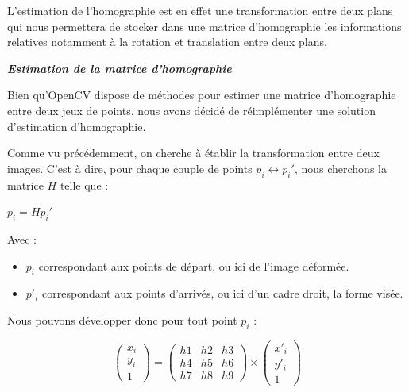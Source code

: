         L'estimation de l'homographie est en effet une transformation entre deux plans qui nous permettera de stocker dans une matrice d'homographie les informations relatives notamment à la rotation et translation entre deux plans.

        \textbf{\textit{Estimation de la matrice d'homographie}}

        Bien qu'OpenCV dispose de méthodes pour estimer une matrice d'homographie entre deux jeux de points, nous avons décidé de réimplémenter une solution d'estimation d'homographie.

        Comme vu précédemment, on cherche à établir la transformation entre deux images. C'est à dire, pour chaque couple de points $p_i \leftrightarrow p_{i}' $, nous cherchons la matrice $H$ telle que :
    
        \begin{center}
            $ p_i = Hp_i' $            
        \end{center}

        Avec :

        \begin{itemize}
            \item $ p_i $ correspondant aux points de départ, ou ici de l'image déformée.
            \item $ p'_i $ correspondant aux points d'arrivés, ou ici d'un cadre droit, la forme visée.
        \end{itemize}
            
        Nous pouvons développer donc pour tout point $p_i$ :
    
        \[
            \begin{pmatrix}
                x_i \\
                y_i \\
                1      
            \end{pmatrix}
            = 
            \begin{pmatrix}
                h1 & h2 & h3 \\
                h4 & h5 & h6 \\
                h7 & h8 & h9      
            \end{pmatrix} 
            \times
            \begin{pmatrix}
                x'_i \\
                y'_i \\
                1      
            \end{pmatrix}
            \]
        
